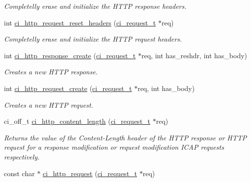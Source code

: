 \begin{DoxyCompactItemize}
\begin{DoxyCompactList}\small\item\em Completelly erase and initialize the HTTP response headers. \item\end{DoxyCompactList}\item 
int \hyperlink{group__HTTP_ga22c5b174646f510f0c8d8fbb5c112ef2}{ci\_\-http\_\-request\_\-reset\_\-headers} (\hyperlink{group__REQUEST_ga27da5c4ae491f527ce36901c2e78ea04}{ci\_\-request\_\-t} $\ast$req)
\begin{DoxyCompactList}\small\item\em Completelly erase and initialize the HTTP request headers. \item\end{DoxyCompactList}\item 
int \hyperlink{group__HTTP_gaad9f358ca7cd20aeca59b954b0d69a02}{ci\_\-http\_\-response\_\-create} (\hyperlink{group__REQUEST_ga27da5c4ae491f527ce36901c2e78ea04}{ci\_\-request\_\-t} $\ast$req, int has\_\-reshdr, int has\_\-body)
\begin{DoxyCompactList}\small\item\em Creates a new HTTP response. \item\end{DoxyCompactList}\item 
int \hyperlink{group__HTTP_ga7c44c88b00ba822fdeffa9bef6a83adf}{ci\_\-http\_\-request\_\-create} (\hyperlink{group__REQUEST_ga27da5c4ae491f527ce36901c2e78ea04}{ci\_\-request\_\-t} $\ast$req, int has\_\-body)
\begin{DoxyCompactList}\small\item\em Creates a new HTTP request. \item\end{DoxyCompactList}\item 
ci\_\-off\_\-t \hyperlink{group__HTTP_gad381fe7908af08f1543c858d24cfbfdf}{ci\_\-http\_\-content\_\-length} (\hyperlink{group__REQUEST_ga27da5c4ae491f527ce36901c2e78ea04}{ci\_\-request\_\-t} $\ast$req)
\begin{DoxyCompactList}\small\item\em Returns the value of the Content-\/Length header of the HTTP response or HTTP request for a response modification or request modification ICAP requests respectively. \item\end{DoxyCompactList}\item 
const char $\ast$ \hyperlink{group__HTTP_ga44e273b39d82a7c8f13f70586760b130}{ci\_\-http\_\-request} (\hyperlink{group__REQUEST_ga27da5c4ae491f527ce36901c2e78ea04}{ci\_\-request\_\-t} $\ast$req)

\end{DoxyCompactItemize}
